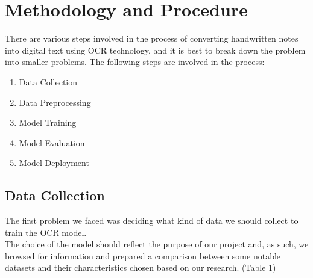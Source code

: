 \documentclass[twoside,a4paper]{article}
\begin{document}
\section{Methodology and Procedure}
There are various steps involved in the process of converting handwritten notes into digital text using OCR technology, and it is best to break down the problem into smaller problems.
The following steps are involved in the process:
\begin{enumerate}
    \item Data Collection
    \item Data Preprocessing
    \item Model Training
    \item Model Evaluation
    \item Model Deployment
\end{enumerate}

\subsection{Data Collection}



The first problem we faced was deciding what kind of data we should collect to train the OCR model.\\
The choice of the model should reflect the purpose of our project and, as such, we browsed for information and prepared a comparison between some notable datasets and their characteristics chosen based on our research. (Table 1)
\end{document}
